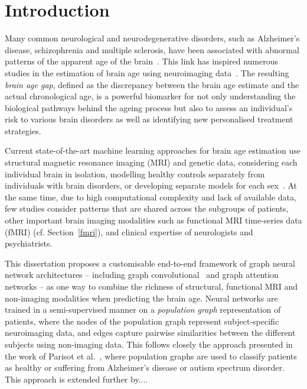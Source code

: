 \chapter{Introduction}



Many common neurological and neurodegenerative disorders, such as Alzheimer’s disease, schizophrenia and multiple sclerosis, have been associated with abnormal patterns of the apparent age of the brain~\cite{kaufmann2019}. This link has inspired numerous studies in the estimation of brain age using neuroimaging data~\cite{franke2019ten}. The resulting \textit{brain age gap}, defined as the discrepancy between the brain age estimate and the actual chronological age, is a powerful biomarker for not only understanding the biological pathways behind the ageing process but also to assess an individual’s risk to various brain disorders as well as identifying new personalised treatment strategies.

Current state-of-the-art machine learning approaches for brain age estimation use structural magnetic resonance imaging (MRI) and genetic data, considering each individual brain in isolation, modelling healthy controls separately from individuals with brain disorders, or developing separate models for each sex~\cite{kaufmann2019,niu2019improved}. At the same time, due to high computational complexity and lack of available data, few studies consider patterns that are shared across the subgroups of patients, other important brain imaging modalities such as functional MRI time-series data (fMRI) (cf. Section~\ref{fmri}), and clinical expertise of neurologists and psychiatrists.

This dissertation proposes a customisable end-to-end framework of graph neural network architectures – including graph convolutional~\cite{kipf2017semi} and graph attention~\cite{velickovic2018graph} networks – as one way to combine the richness of structural, functional MRI and non-imaging modalities when predicting the brain age. Neural networks are trained in a semi-supervised manner on a \textit{population graph} representation of patients, where the nodes of the population graph represent subject-specific neuroimaging data, and edges capture pairwise similarities between the different subjects using non-imaging data. This follows closely the approach presented in the work of Parisot et al.~\cite{parisot2017spectral,parisot2018disease}, where population graphs are used to classify patients as healthy or suffering from Alzheimer's disease or autism spectrum disorder. This approach is extended further by.... 

